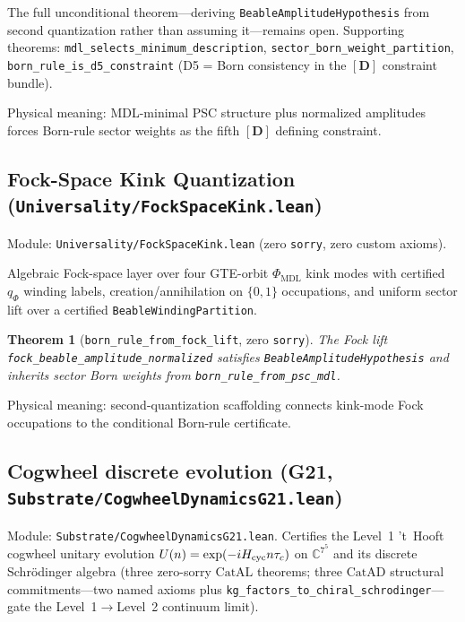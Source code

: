\documentclass[11pt,a4paper]{article}
\newtheorem{theorem}{Theorem}[section]
\theoremstyle{definition}
\newcommand{\CatAL}{\ensuremath{\mathrm{CatAL}}}
\newcommand{\CatAD}{\ensuremath{\mathrm{CatAD}}}
\begin{document}
The full unconditional theorem---deriving \lstinline|BeableAmplitudeHypothesis|
from second quantization rather than assuming it---remains open.
Supporting theorems: \lstinline|mdl_selects_minimum_description|,
\lstinline|sector_born_weight_partition|, \lstinline|born_rule_is_d5_constraint|
(D5 = Born consistency in the $[\mathbf{D}]$ constraint bundle).

Physical meaning: MDL-minimal PSC structure plus normalized amplitudes forces
Born-rule sector weights as the fifth $[\mathbf{D}]$ defining constraint.

\subsection{Fock-Space Kink Quantization
  (\texttt{Universality/FockSpaceKink.lean})}\label{subsec:fock-space-kink}

Module: \texttt{Universality/FockSpaceKink.lean} (zero
\lstinline|sorry|, zero custom axioms).

Algebraic Fock-space layer over four GTE-orbit $\Phi_{\mathrm{MDL}}$ kink modes
with certified $q_\Phi$ winding labels, creation/annihilation on
$\{0,1\}$ occupations, and uniform sector lift over a certified
\lstinline|BeableWindingPartition|.

\begin{theorem}[\lstinline|born_rule_from_fock_lift|, zero \texttt{sorry}]
The Fock lift \lstinline|fock_beable_amplitude_normalized| satisfies
\lstinline|BeableAmplitudeHypothesis| and inherits sector Born weights from
\lstinline|born_rule_from_psc_mdl|.
\end{theorem}

Physical meaning: second-quantization scaffolding connects kink-mode Fock
occupations to the conditional Born-rule certificate.

\subsection{Cogwheel discrete evolution (G21,
  \texttt{Substrate/CogwheelDynamicsG21.lean})}\label{subsec:cogwheel-g21}

Module: \texttt{Substrate/CogwheelDynamicsG21.lean}.  Certifies the Level~1
't~Hooft cogwheel unitary evolution $U(n)=\exp(-iH_{\rm cyc}n\tau_c)$ on
$\mathbb{C}^{7^5}$ and its discrete Schr\"odinger algebra (three zero-sorry
$\CatAL$ theorems; three $\CatAD$ structural commitments---two named axioms
plus \lstinline|kg_factors_to_chiral_schrodinger|---gate the Level~1$\to$Level~2
continuum limit).
\end{document}
